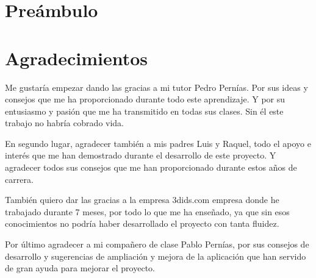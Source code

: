 \chapter*{Preámbulo}





\chapter*{Agradecimientos}

Me gustaría empezar dando las gracias a mi tutor Pedro Pernías. Por sus ideas y consejos que me ha proporcionado durante todo este aprendizaje. Y por su entusiasmo y pasión que me ha transmitido en todas sus clases. Sin él este trabajo no habría cobrado vida.

\vspace{5 mm}

En segundo lugar, agradecer también a mis padres Luis y Raquel, todo el apoyo e interés que me han demostrado durante el desarrollo de este proyecto. Y agradecer todos sus consejos que me han proporcionado durante estos años de carrera.

\vspace{5 mm}

También quiero dar las gracias a la empresa 3dids.com empresa donde he trabajado durante 7 meses, por todo lo que me ha enseñado, ya que sin esos conocimientos no podría haber desarrollado el proyecto con tanta fluidez.


\vspace{5 mm}

Por último agradecer a mi compañero de clase Pablo Pernías, por sus consejos de desarrollo y sugerencias de ampliación y mejora de la aplicación que han servido de gran ayuda para mejorar el proyecto.
